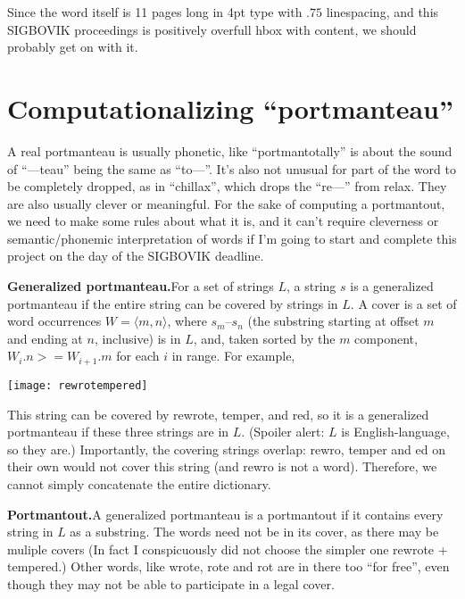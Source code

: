 \documentclass{article}
\begin{document}
Since the word itself is
11 pages
long in 4pt type with $.75$ linespacing, and this SIGBOVIK proceedings is positively overfull
hbox with content, we should probably get on with it.

\section{Computationalizing ``portmanteau''}

A real portmanteau is usually phonetic, like ``portmantotally'' is
about the sound of ``---teau'' being the same as ``to---''. It's also
not unusual for part of the word to be completely dropped, as in
``chillax'', which drops the ``re---'' from {\sf relax}. They are also
usually clever or meaningful. For the sake of computing a portmantout,
we need to make some rules about what it is, and it can't require
cleverness or semantic/phonemic interpretation of words if I'm going to
start and complete this project on the day of the SIGBOVIK deadline.

{\bf Generalized portmanteau.}\quad For a set of strings $L$, a string
$s$ is a generalized portmanteau if the entire string can be covered
by strings in $L$. A cover is a set of word occurrences $W = \langle m, n \rangle$,
where $s_m$--$s_n$ (the substring starting at offset $m$ and ending at $n$, inclusive)
is in $L$, and, taken sorted by the $m$ component, $W_i.n >= W_{i+1}.m$ for
each $i$ in range. For example,

\qquad\qquad\qquad\qquad\qquad\qquad\qquad\qquad\qquad\texttt{[image: rewrotempered]}


This string can be covered by {\sf rewrote}, {\sf temper}, and {\sf
  red}, so it is a generalized portmanteau if these three strings are
in $L$. (Spoiler alert: $L$ is English-language, so they are.)
Importantly, the covering strings overlap: {\sf rewro}, {\sf temper}
and {\sf ed} on their own would not cover this string (and {\sf rewro}
is not a word). Therefore, we cannot simply concatenate the entire
dictionary.

{\bf Portmantout.}\quad A generalized portmanteau is a portmantout if
it contains every string in $L$ as a substring. The words need not be
in its cover, as there may be muliple covers (In fact I conspicuously
did not choose the simpler one {\sf rewrote} + {\sf tempered}.) Other
words, like {\sf wrote}, {\sf rote} and {\sf rot} are in there
too ``for free'', even though they may not be able to participate in
a legal cover.
\end{document}
